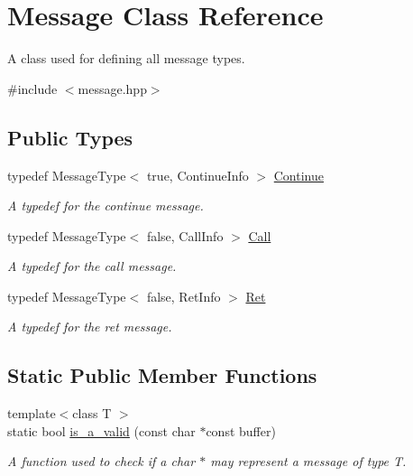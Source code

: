 \hypertarget{class_message}{}\section{Message Class Reference}
\label{class_message}


A class used for defining all message types.  




{\ttfamily \#include $<$message.\+hpp$>$}

\subsection*{Public Types}
\begin{DoxyCompactItemize}
\item 
typedef Message\+Type$<$ true, Continue\+Info $>$ \hyperlink{class_message_a04de61b84a209cdf372b6f53f3adf7c4}{Continue}
\begin{DoxyCompactList}\small\item\em A typedef for the continue message. \end{DoxyCompactList}\item 
typedef Message\+Type$<$ false, Call\+Info $>$ \hyperlink{class_message_a0fd0ed431cb0d672045d09368a5d2126}{Call}
\begin{DoxyCompactList}\small\item\em A typedef for the call message. \end{DoxyCompactList}\item 
typedef Message\+Type$<$ false, Ret\+Info $>$ \hyperlink{class_message_a146628035f5a0723cb04f7a328858e34}{Ret}
\begin{DoxyCompactList}\small\item\em A typedef for the ret message. \end{DoxyCompactList}\end{DoxyCompactItemize}
\subsection*{Static Public Member Functions}
\begin{DoxyCompactItemize}
\item 
{\footnotesize template$<$class T $>$ }\\static bool \hyperlink{class_message_ada73859c8d199a7925b0ba3999cc3eef}{is\+\_\+a\+\_\+valid} (const char $\ast$const buffer)
\begin{DoxyCompactList}\small\item\em A function used to check if a char $\ast$ may represent a message of type T. \end{DoxyCompactList}\end{DoxyCompactItemize}


